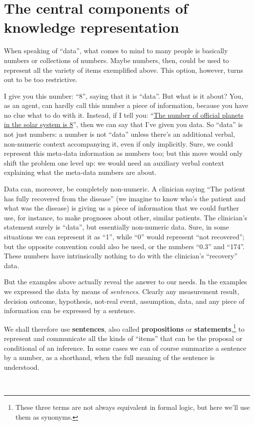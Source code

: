 \documentclass[
  a4paper,
  DIV=11,
  numbers=noendperiod,
  oneside]{scrreprt}
\begin{document}
\hypertarget{the-central-components-of-knowledge-representation}{%
\section{The central components of knowledge
representation}\label{the-central-components-of-knowledge-representation}}

When speaking of ``data'', what comes to mind to many people is
basically numbers or collections of numbers. Maybe numbers, then, could
be used to represent all the variety of items exemplified above. This
option, however, turns out to be too restrictive.

I give you this number: {``\(8\)'',} saying that it is ``data''. But
what is it about? You, as an agent, can hardly call this number a piece
of information, because you have no clue what to do with it. Instead, if
I tell you: ``\href{https://solarsystem.nasa.gov/planets/overview}{The
number of official planets in the solar system is 8}'', then we can say
that I've given you data. So ``data'' is not just numbers: a number is
not ``data'' unless there's an additional verbal, non-numeric context
accompanying it, even if only implicitly. Sure, we could represent this
meta-data information as numbers too; but this move would only shift the
problem one level up: we would need an auxiliary verbal context
explaining what the meta-data numbers are about.

Data can, moreover, be completely non-numeric. A clinician saying ``The
patient has fully recovered from the disease'' (we imagine to know who's
the patient and what was the disease) is giving us a piece of
information that we could further use, for instance, to make prognoses
about other, similar patients. The clinician's statement surely is
``data'', but essentially non-numeric data. Sure, in some situations we
can represent it as ``1'', while ``0'' would represent ``not
recovered''; but the opposite convention could also be used, or the
numbers ``0.3'' and ``174''. These numbers have intrinsically nothing to
do with the clinician's ``recovery'' data.

But the examples above actually reveal the answer to our needs. In the
examples we expressed the data by means of \emph{sentences}. Clearly any
measurement result, decision outcome, hypothesis, not-real event,
assumption, data, and any piece of information can be expressed by a
sentence.

We shall therefore use {\textbf{sentences}}, also called
{\textbf{propositions}} or \textbf{statements},\footnote{These three
  terms are not always equivalent in formal logic, but here we'll use
  them as synonyms.} to represent and communicate all the kinds of
``items'' that can be the proposal or conditional of an inference. In
some cases we can of course summarize a sentence by a number, as a
shorthand, when the full meaning of the sentence is understood.\\
\strut \\
\end{document}
